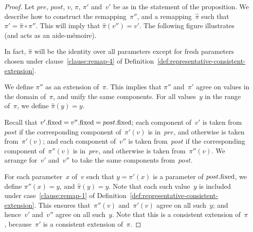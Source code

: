\begin{proof}
Let $pre$, $post$, $v$, $\pi$, $\pi'$ and~$v'$ be as in the statement of the
proposition.  We describe how to construct the remapping~$\pi''$, and a
remapping~$\hat\pi$ such that $\pi' = \hat\pi \circ \pi''$.  This will imply
that $\hat\pi(v'') = v'$.  The following figure illustrates (and acts as an
aide-m\'emoire).
%
\begin{center}
\end{center}
%
In fact, $\hat\pi$ will be the identity over all parameters except for fresh
parameters chosen under clause~\ref{clause:remap-4} of
Definition~\ref{def:representative-consistent-extension}.

We define $\pi''$ as an extension of~$\pi$.  This implies that $\pi''$
and~$\pi'$ agree on values in the domain of~$\pi$, and unify the same
components.  For all values~$y$ in the range of~$\pi$, we define $\hat\pi(y) =
y$. 

Recall that $v'.\mathrm{fixed} = v''.\mathrm{fixed} = post.\mathrm{fixed}$; each component of~$v'$ is
taken from~$post$ if the corresponding component of~$\pi'(v)$ is in~$pre$, and
otherwise is taken from~$\pi'(v)$; and each component of~$v''$ is taken
from~$post$ if the corresponding component of~$\pi''(v)$ is in~$pre$, and
otherwise is taken from~$\pi''(v)$.  We arrange for~$v'$ and~$v''$ to take the
same components from~$post$.


For each parameter~$x$ of~$v$ such that $y = \pi'(x)$ is a parameter of
$post.\mathrm{fixed}$, we define $\pi''(x) = y$, and $\hat\pi(y) = y$.  Note that each
such value~$y$ is included under case~\ref{clause:remap-1} of
Definition~\ref{def:representative-consistent-extension}.  This ensures
that~$\pi''(v)$ and~$\pi'(v)$ agree on all such~$y$; and hence~$v'$ and~$v''$
agree on all such~$y$.  Note that this is a consistent extension of~$\pi$,
because~$\pi'$ is a consistent extension of~$\pi$.  


\end{proof}

